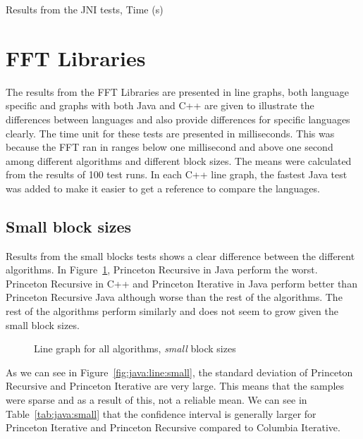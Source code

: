 \begin{table}[H]
    \centering
    \caption{Results from the JNI tests, Time (\textmu s)}
    \label{tab:jni:common}
    
\end{table}



\section{FFT Libraries}
The results from the FFT Libraries are presented in line graphs, both language specific and graphs with both Java and C++ are given to illustrate the differences between languages and also provide differences for specific languages clearly. The time unit for these tests are presented in milliseconds. This was because the FFT ran in ranges below one millisecond and above one second among different algorithms and different block sizes. The means were calculated from the results of 100 test runs.  In each C++ line graph, the fastest Java test was added to make it easier to get a reference to compare the languages.

\subsection{Small block sizes}
Results from the small blocks tests shows a clear difference between the different algorithms. In Figure~\ref{fig:all:line:small}, Princeton Recursive in Java perform the worst. Princeton Recursive in C++ and Princeton Iterative in Java perform better than Princeton Recursive Java although worse than the rest of the algorithms. The rest of the algorithms perform similarly and does not seem to grow given the small block sizes.

\begin{figure}
    \centering
    
    \caption{Line graph for all algorithms, \emph{small} block sizes}
    \label{fig:all:line:small}
\end{figure}

As we can see in Figure~\ref{fig:java:line:small}, the standard deviation of Princeton Recursive and Princeton Iterative are very large. This means that the samples were sparse and as a result of this, not a reliable mean. We can see in Table~\ref{tab:java:small} that the confidence interval is generally larger for Princeton Iterative and Princeton Recursive compared to Columbia Iterative.

